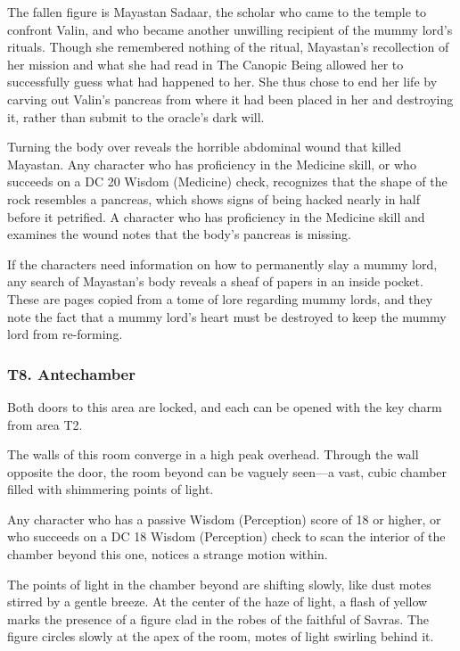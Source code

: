 \documentclass[10pt,a4paper,twoside,bg=print,twocolumn,openany,nodeprecatedcode]{dndbook}
\begin{document}
The fallen figure is Mayastan Sadaar, the scholar who came to the temple to confront Valin, and who became another unwilling recipient of the mummy lord's rituals. Though she remembered nothing of the ritual, Mayastan's recollection of her mission and what she had read in The Canopic Being allowed her to successfully guess what had happened to her. She thus chose to end her life by carving out Valin's pancreas from where it had been placed in her and destroying it, rather than submit to the oracle's dark will.

Turning the body over reveals the horrible abdominal wound that killed Mayastan. Any character who has proficiency in the Medicine skill, or who succeeds on a DC 20 Wisdom (Medicine) check, recognizes that the shape of the rock resembles a pancreas, which shows signs of being hacked nearly in half before it petrified. A character who has proficiency in the Medicine skill and examines the wound notes that the body's pancreas is missing.

If the characters need information on how to permanently slay a mummy lord, any search of Mayastan's body reveals a sheaf of papers in an inside pocket. These are pages copied from a tome of lore regarding mummy lords, and they note the fact that a mummy lord's heart must be destroyed to keep the mummy lord from re-forming.

\subsubsection{T8. Antechamber}
Both doors to this area are locked, and each can be opened with the key charm from area T2.

\begin{DndReadAloud}{}
The walls of this room converge in a high peak overhead. Through the wall opposite the door, the room beyond can be vaguely seen—a vast, cubic chamber filled with shimmering points of light.

\end{DndReadAloud}

Any character who has a passive Wisdom (Perception) score of 18 or higher, or who succeeds on a DC 18 Wisdom (Perception) check to scan the interior of the chamber beyond this one, notices a strange motion within.

\begin{DndReadAloud}{}
The points of light in the chamber beyond are shifting slowly, like dust motes stirred by a gentle breeze. At the center of the haze of light, a flash of yellow marks the presence of a figure clad in the robes of the faithful of Savras. The figure circles slowly at the apex of the room, motes of light swirling behind it.

\end{DndReadAloud}
\end{document}
